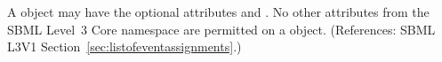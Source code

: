A \ListOfEventAssignments object may have the optional attributes
  and .  No other attributes from the SBML
Level~3 Core namespace are permitted on a \ListOfEventAssignments object.
(References: SBML L3V1 Section~\ref{sec:listofeventassignments}.)
